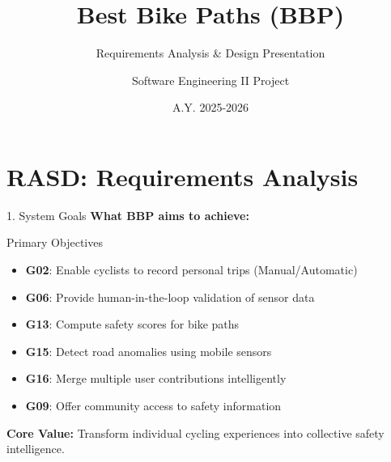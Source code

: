 \documentclass[aspectratio=169, 10pt]{beamer}
\title{Best Bike Paths (BBP)}
\subtitle{Requirements Analysis \& Design Presentation}
\author{Software Engineering II Project}
\institute{Politecnico di Milano}
\date{A.Y. 2025-2026}
\begin{document}
\begin{frame}[plain]
    \vspace{1cm}
    \maketitle
\end{frame}

\section{RASD: Requirements Analysis}

\begin{frame}{1. System Goals}
    \textbf{What BBP aims to achieve:}
    
    \vspace{0.3cm}
    \begin{block}{Primary Objectives}
        \begin{itemize}
            \item \textbf{G02}: Enable cyclists to record personal trips (Manual/Automatic)
            \item \textbf{G06}: Provide human-in-the-loop validation of sensor data
            \item \textbf{G13}: Compute safety scores for bike paths
            \item \textbf{G15}: Detect road anomalies using mobile sensors
            \item \textbf{G16}: Merge multiple user contributions intelligently
            \item \textbf{G09}: Offer community access to safety information
        \end{itemize}
    \end{block}
    
    \vspace{0.2cm}
    \textbf{Core Value:} Transform individual cycling experiences into collective safety intelligence.
\end{frame}
\end{document}
